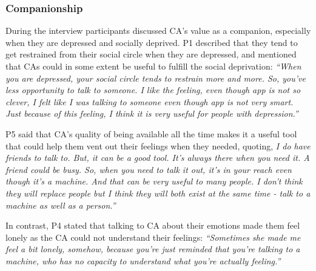         \subsubsection{Companionship}
            During the interview participants discussed \ac{CA}'s value as a companion, especially when they are depressed and socially deprived. P1 described that they tend to get restrained from their social circle when they are depressed, and mentioned that \acp{CA} could in some extent be useful to fulfill the social deprivation:
                \textit{``When you are depressed, your social circle tends to restrain more and more. So, you’ve less opportunity to talk to someone. I like the feeling, even though \acl{app} is not so clever, I felt like I was talking to someone even though \acl{app} is not very smart. Just because of this feeling, I think it is very useful for people with depression.''}

            P5 said that \ac{CA}'s quality of being available all the time makes it a useful tool that could help them vent out their feelings when they needed, quoting,
                \textit{I do have friends to talk to. But, it can be a good tool. It’s always there when you need it. A friend could be busy. So, when you need to talk it out, it’s in your reach even though it’s a machine. And that can be very useful to many people. I don't think they will replace people but I think they will both exist at the same time - talk to a machine as well as a person.'' }
           
        In contrast, P4 stated that talking to \ac{CA} about their emotions made them feel lonely as the \ac{CA} could not understand their feelings:
                \textit{
                ``Sometimes she made me feel a bit lonely, somehow, because 
                you're just reminded that you're talking to a machine, who has no capacity to understand what you're actually feeling.''} 

